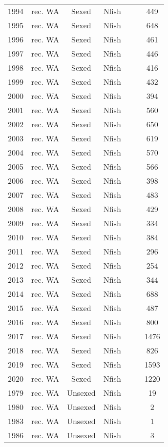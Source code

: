 \begin{longtable}[t]{c>{\centering\arraybackslash}p{3cm}ccccc}
1994 & rec. WA & Sexed & Nfish &  &  & 449\\
1995 & rec. WA & Sexed & Nfish &  &  & 648\\
1996 & rec. WA & Sexed & Nfish &  &  & 461\\
1997 & rec. WA & Sexed & Nfish &  &  & 446\\
1998 & rec. WA & Sexed & Nfish &  &  & 416\\
1999 & rec. WA & Sexed & Nfish &  &  & 432\\
2000 & rec. WA & Sexed & Nfish &  &  & 394\\
2001 & rec. WA & Sexed & Nfish &  &  & 560\\
2002 & rec. WA & Sexed & Nfish &  &  & 650\\
2003 & rec. WA & Sexed & Nfish &  &  & 619\\
2004 & rec. WA & Sexed & Nfish &  &  & 570\\
2005 & rec. WA & Sexed & Nfish &  &  & 566\\
2006 & rec. WA & Sexed & Nfish &  &  & 398\\
2007 & rec. WA & Sexed & Nfish &  &  & 483\\
2008 & rec. WA & Sexed & Nfish &  &  & 429\\
2009 & rec. WA & Sexed & Nfish &  &  & 334\\
2010 & rec. WA & Sexed & Nfish &  &  & 384\\
2011 & rec. WA & Sexed & Nfish &  &  & 296\\
2012 & rec. WA & Sexed & Nfish &  &  & 254\\
2013 & rec. WA & Sexed & Nfish &  &  & 344\\
2014 & rec. WA & Sexed & Nfish &  &  & 688\\
2015 & rec. WA & Sexed & Nfish &  &  & 487\\
2016 & rec. WA & Sexed & Nfish &  &  & 800\\
2017 & rec. WA & Sexed & Nfish &  &  & 1476\\
2018 & rec. WA & Sexed & Nfish &  &  & 826\\
2019 & rec. WA & Sexed & Nfish &  &  & 1593\\
2020 & rec. WA & Sexed & Nfish &  &  & 1220\\
1979 & rec. WA & Unsexed & Nfish &  &  & 19\\
1980 & rec. WA & Unsexed & Nfish &  &  & 2\\
1983 & rec. WA & Unsexed & Nfish &  &  & 1\\
1986 & rec. WA & Unsexed & Nfish &  &  & 3\\

\end{longtable}
